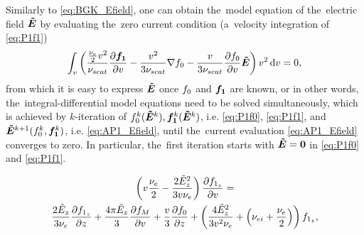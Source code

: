 Similarly to \eqref{eq:BGK_Efield}, one can obtain the~model equation of 
the~electric field $\boldsymbol{\tilde{E}}$ by evaluating the~zero current condition 
(a~velocity integration of \eqref{eq:P1f1})
\begin{equation}
  \int_{v} \left(\frac{\frac{\nu_{e}}{2}v^2}{\nu_{scat}}
  \frac{\partial{\boldsymbol{f_1}}}{\partial{v}} 
  - \frac{v^2}{3\nu_{scat}}
  \nabla f_0 
  - \frac{v}{3\nu_{scat}}\frac{\partial{f_0}}{\partial{v}}\boldsymbol{\tilde{E}}
  \right) v^2\, \text{d}v = 0 ,
  \label{eq:AP1_Efield}
\end{equation}
from which it is easy to express $\boldsymbol{\tilde{E}}$ once $f_0$ and $\boldsymbol{f_1}$ are known, or
in other words, the~integral-differential model equations need to be solved 
simultaneously, which is achieved by $k$-iteration of 
$f_0^k(\boldsymbol{\tilde{E}}^k), \boldsymbol{f_1}^k(\boldsymbol{\tilde{E}}^k)$, i.e. \eqref{eq:P1f0}, \eqref{eq:P1f1}, and 
$\boldsymbol{\tilde{E}}^{k+1}(f_0^k, \boldsymbol{f_1}^k)$, i.e.  \eqref{eq:AP1_Efield}, until 
the~current evaluation \eqref{eq:AP1_Efield} converges to zero. In particular,
the~first iteration starts with $\boldsymbol{\tilde{E}}=\boldsymbol{0}$ in \eqref{eq:P1f0} and 
\eqref{eq:P1f1}.

\begin{multline}
  \left(v\frac{\nu_{e}}{2} - \frac{2\tilde{E}_z^2}{3v\nu_{e}}\right) 
  \frac{\partial{f_{1_z}}}{\partial{v}} 
  =\\
  \frac{2\tilde{E}_z}{3\nu_{e}}\frac{\partial{f_{1_z}}}{\partial{z}}  
  + \frac{4\pi\tilde{E}_z}{3}\frac{\partial{f_M}}{\partial{v}}
  + \frac{v}{3}\frac{\partial{f_0}}{\partial{z}} 
  + \left(\frac{4\tilde{E}_z^2}{3v^2\nu_{e}}
  + \left(\nu_{ei} + \frac{\nu_{e}}{2}\right) \right)f_{1_z}
  , \nonumber
\end{multline}

